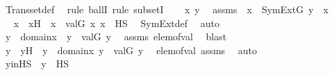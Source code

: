 \begin{isabellebody}
\ Transset{\isacharunderscore}{\kern0pt}def\ \isanewline
{}\isamarkupfalse%
\ {\isacharparenleft}{\kern0pt}rule\ ballI{\isacharsemicolon}{\kern0pt}\ rule\ subsetI{\isacharparenright}{\kern0pt}\isanewline
\ \ \isamarkupfalse%
\ x\ y\ \isamarkupfalse%
\ assms\ {\isacharcolon}{\kern0pt}\ {\isachardoublequoteopen}x\ {\isasymin}\ SymExt{\isacharparenleft}{\kern0pt}G{\isacharparenright}{\kern0pt}{\isachardoublequoteclose}\ {\isachardoublequoteopen}y\ {\isasymin}\ x{\isachardoublequoteclose}\ \isanewline
\ \ \isamarkupfalse%
\ \isamarkupfalse%
\ x{\isacharprime}{\kern0pt}\ \ x{\isacharprime}{\kern0pt}H\ {\isacharcolon}{\kern0pt}\ {\isachardoublequoteopen}x\ {\isacharequal}{\kern0pt}\ val{\isacharparenleft}{\kern0pt}G{\isacharcomma}{\kern0pt}\ x{\isacharprime}{\kern0pt}{\isacharparenright}{\kern0pt}{\isachardoublequoteclose}\ {\isachardoublequoteopen}x{\isacharprime}{\kern0pt}\ {\isasymin}\ HS{\isachardoublequoteclose}\ \isamarkupfalse%
\ SymExt{\isacharunderscore}{\kern0pt}def\ \isamarkupfalse%
\ auto\isanewline
\ \ \isamarkupfalse%
\ \isamarkupfalse%
\ {\isachardoublequoteopen}{\isasymexists}y{\isacharprime}{\kern0pt}\ {\isasymin}\ domain{\isacharparenleft}{\kern0pt}x{\isacharprime}{\kern0pt}{\isacharparenright}{\kern0pt}\ {\isachardot}{\kern0pt}\ y\ {\isacharequal}{\kern0pt}\ val{\isacharparenleft}{\kern0pt}G{\isacharcomma}{\kern0pt}\ y{\isacharprime}{\kern0pt}{\isacharparenright}{\kern0pt}{\isachardoublequoteclose}\ \isamarkupfalse%
\ assms\ elem{\isacharunderscore}{\kern0pt}of{\isacharunderscore}{\kern0pt}val\ \isamarkupfalse%
\ blast\ \isanewline
\ \ \isamarkupfalse%
\ \isamarkupfalse%
\ y{\isacharprime}{\kern0pt}\ \ y{\isacharprime}{\kern0pt}H\ {\isacharcolon}{\kern0pt}\ {\isachardoublequoteopen}y{\isacharprime}{\kern0pt}\ {\isasymin}\ domain{\isacharparenleft}{\kern0pt}x{\isacharprime}{\kern0pt}{\isacharparenright}{\kern0pt}{\isachardoublequoteclose}\ {\isachardoublequoteopen}y\ {\isacharequal}{\kern0pt}\ val{\isacharparenleft}{\kern0pt}G{\isacharcomma}{\kern0pt}\ y{\isacharprime}{\kern0pt}{\isacharparenright}{\kern0pt}{\isachardoublequoteclose}\ \isamarkupfalse%
\ elem{\isacharunderscore}{\kern0pt}of{\isacharunderscore}{\kern0pt}val\ assms\ \isamarkupfalse%
\ auto\isanewline
\ \ \isamarkupfalse%
\ \isamarkupfalse%
\ y{\isacharprime}{\kern0pt}inHS\ {\isacharcolon}{\kern0pt}\ {\isachardoublequoteopen}y{\isacharprime}{\kern0pt}\ {\isasymin}\ HS{\isachardoublequoteclose}\ \isamarkupfalse%

\end{isabellebody}
